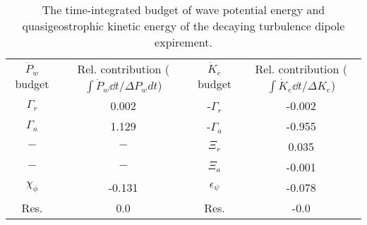 \begin{table}
\begin{center}
\caption{The time-integrated budget of wave potential energy and quasigeostrophic                kinetic energy of the decaying turbulence dipole expirement. \label{table2}}
\begin{tabular}{cccc}
$\dot{P}_w$ budget & Rel. contribution ($\int\dot{P}_w \dd t/\Delta P_w dt$) & $\dot{K}_e$ budget & Rel. contribution ($\int\dot{K}_e \dd t/\Delta K_e$) \\
$\Gamma_r$ & 0.002 & -$\Gamma_r$ & -0.002 \\
$\Gamma_a$ & 1.129 & -$\Gamma_a$ & -0.955 \\
$-$ & $-$ & $\Xi_r$ & 0.035 \\
$-$ & $-$ & $\Xi_a$ & -0.001 \\
$\chi_\phi$ & -0.131 & $\epsilon_\psi$ & -0.078 \\
Res. & 0.0 & Res. & -0.0 \\
\end{tabular}
\end{center}
\end{table}
